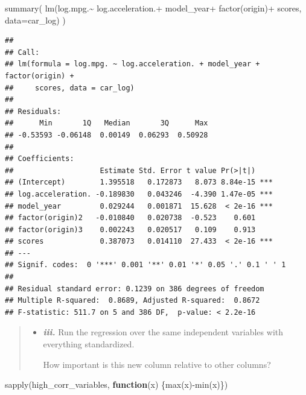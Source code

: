 \documentclass[
]{article}
\newenvironment{Shaded}{\begin{snugshade}}{\end{snugshade}}
\newcommand{\AttributeTok}[1]{\textcolor[rgb]{0.77,0.63,0.00}{#1}}
\newcommand{\ControlFlowTok}[1]{\textcolor[rgb]{0.13,0.29,0.53}{\textbf{#1}}}
\newcommand{\FunctionTok}[1]{\textcolor[rgb]{0.00,0.00,0.00}{#1}}
\newcommand{\NormalTok}[1]{#1}
\newcommand{\SpecialCharTok}[1]{\textcolor[rgb]{0.00,0.00,0.00}{#1}}
\begin{document}
\begin{Shaded}
\begin{Highlighting}[]
\FunctionTok{summary}\NormalTok{(}
  \FunctionTok{lm}\NormalTok{(log.mpg.}\SpecialCharTok{\textasciitilde{}}
\NormalTok{       log.acceleration.}\SpecialCharTok{+}
\NormalTok{       model\_year}\SpecialCharTok{+}
       \FunctionTok{factor}\NormalTok{(origin)}\SpecialCharTok{+}
\NormalTok{       scores,}
     \AttributeTok{data=}\NormalTok{car\_log)}
\NormalTok{)}
\end{Highlighting}
\end{Shaded}

\begin{verbatim}
## 
## Call:
## lm(formula = log.mpg. ~ log.acceleration. + model_year + factor(origin) + 
##     scores, data = car_log)
## 
## Residuals:
##      Min       1Q   Median       3Q      Max 
## -0.53593 -0.06148  0.00149  0.06293  0.50928 
## 
## Coefficients:
##                    Estimate Std. Error t value Pr(>|t|)    
## (Intercept)        1.395518   0.172873   8.073 8.84e-15 ***
## log.acceleration. -0.189830   0.043246  -4.390 1.47e-05 ***
## model_year         0.029244   0.001871  15.628  < 2e-16 ***
## factor(origin)2   -0.010840   0.020738  -0.523    0.601    
## factor(origin)3    0.002243   0.020517   0.109    0.913    
## scores             0.387073   0.014110  27.433  < 2e-16 ***
## ---
## Signif. codes:  0 '***' 0.001 '**' 0.01 '*' 0.05 '.' 0.1 ' ' 1
## 
## Residual standard error: 0.1239 on 386 degrees of freedom
## Multiple R-squared:  0.8689, Adjusted R-squared:  0.8672 
## F-statistic: 511.7 on 5 and 386 DF,  p-value: < 2.2e-16
\end{verbatim}

\begin{quote}
\begin{itemize}
\item
  \textbf{\emph{iii.}} Run the regression over the same independent
  variables with everything standardized.

  How important is this new column relative to other columns?
\end{itemize}
\end{quote}

\begin{Shaded}
\begin{Highlighting}[]
\FunctionTok{sapply}\NormalTok{(high\_corr\_variables, }\ControlFlowTok{function}\NormalTok{(x) \{}\FunctionTok{max}\NormalTok{(x)}\SpecialCharTok{{-}}\FunctionTok{min}\NormalTok{(x)\})}
\end{Highlighting}
\end{Shaded}
\end{document}
